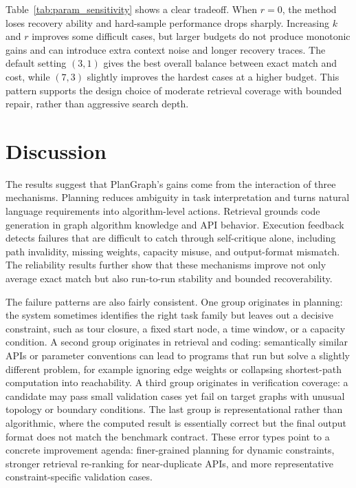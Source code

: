 \documentclass[pdflatex,sn-mathphys-num]{sn-jnl}
\theoremstyle{thmstyleone}
\theoremstyle{thmstyletwo}
\theoremstyle{thmstylethree}
\begin{document}
Table~\ref{tab:param_sensitivity} shows a clear tradeoff. When $r=0$, the method loses recovery ability and hard-sample performance drops sharply. Increasing $k$ and $r$ improves some difficult cases, but larger budgets do not produce monotonic gains and can introduce extra context noise and longer recovery traces. The default setting $(3,1)$ gives the best overall balance between exact match and cost, while $(7,3)$ slightly improves the hardest cases at a higher budget. This pattern supports the design choice of moderate retrieval coverage with bounded repair, rather than aggressive search depth.

\section{Discussion}\label{sec:discussion}

The results suggest that PlanGraph's gains come from the interaction of three mechanisms. Planning reduces ambiguity in task interpretation and turns natural language requirements into algorithm-level actions. Retrieval grounds code generation in graph algorithm knowledge and API behavior. Execution feedback detects failures that are difficult to catch through self-critique alone, including path invalidity, missing weights, capacity misuse, and output-format mismatch. The reliability results further show that these mechanisms improve not only average exact match but also run-to-run stability and bounded recoverability.

The failure patterns are also fairly consistent. One group originates in planning: the system sometimes identifies the right task family but leaves out a decisive constraint, such as tour closure, a fixed start node, a time window, or a capacity condition. A second group originates in retrieval and coding: semantically similar APIs or parameter conventions can lead to programs that run but solve a slightly different problem, for example ignoring edge weights or collapsing shortest-path computation into reachability. A third group originates in verification coverage: a candidate may pass small validation cases yet fail on target graphs with unusual topology or boundary conditions. The last group is representational rather than algorithmic, where the computed result is essentially correct but the final output format does not match the benchmark contract. These error types point to a concrete improvement agenda: finer-grained planning for dynamic constraints, stronger retrieval re-ranking for near-duplicate APIs, and more representative constraint-specific validation cases.
\end{document}
